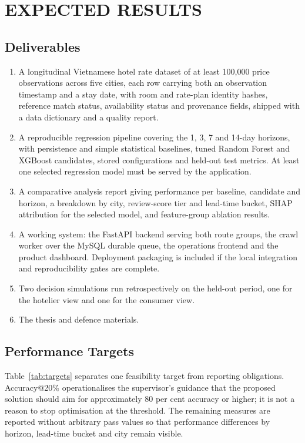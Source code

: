 \chapter{EXPECTED RESULTS}

\section{Deliverables}

\begin{enumerate}[leftmargin=*, itemsep=1pt, parsep=0pt, topsep=2pt]
    \item A longitudinal Vietnamese hotel rate dataset of at least 100,000 price observations across five cities, each row carrying both an observation timestamp and a stay date, with room and rate-plan identity hashes, reference match status, availability status and provenance fields, shipped with a data dictionary and a quality report.
    \item A reproducible regression pipeline covering the 1, 3, 7 and 14-day horizons, with persistence and simple statistical baselines, tuned Random Forest and XGBoost candidates, stored configurations and held-out test metrics. At least one selected regression model must be served by the application.
    \item A comparative analysis report giving performance per baseline, candidate and horizon, a breakdown by city, review-score tier and lead-time bucket, SHAP attribution for the selected model, and feature-group ablation results.
    \item A working system: the FastAPI backend serving both route groups, the crawl worker over the MySQL durable queue, the operations frontend and the product dashboard. Deployment packaging is included if the local integration and reproducibility gates are complete.
    \item Two decision simulations run retrospectively on the held-out period, one for the hotelier view and one for the consumer view.
    \item The thesis and defence materials.
\end{enumerate}

\section{Performance Targets}

Table~\ref{tab:targets} separates one feasibility target from reporting obligations. Accuracy@20\% operationalises the supervisor's guidance that the proposed solution should aim for approximately 80 per cent accuracy or higher; it is not a reason to stop optimisation at the threshold. The remaining measures are reported without arbitrary pass values so that performance differences by horizon, lead-time bucket and city remain visible.

